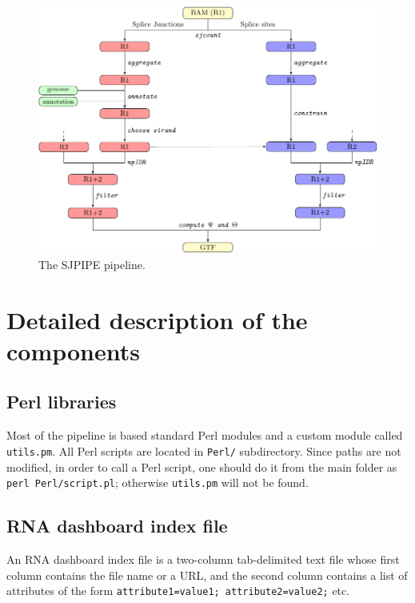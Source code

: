 \documentclass{article}
\begin{document}
\begin{figure}
\centering
\includegraphics[width=\textwidth]{fig1_crop.pdf}
\caption{The SJPIPE pipeline.\label{fig::sjpipe}}
\end{figure}


\section{Detailed description of the components}

\subsection{Perl libraries}
Most of the pipeline is based standard Perl modules and a custom module called {\tt utils.pm}. All Perl scripts are located in {\tt Perl/} subdirectory. 
Since paths are not modified, in order to call a Perl script, one should do it from the main folder as {\tt perl Perl/script.pl}; otherwise {\tt utils.pm} 
will not be found.

\subsection{RNA dashboard index file}
An RNA dashboard index file is a two-column tab-delimited text file whose first column contains the file name or a URL, and the second column contains a list of attributes of the form
{\tt attribute1=value1; attribute2=value2;} etc. 
\end{document}
